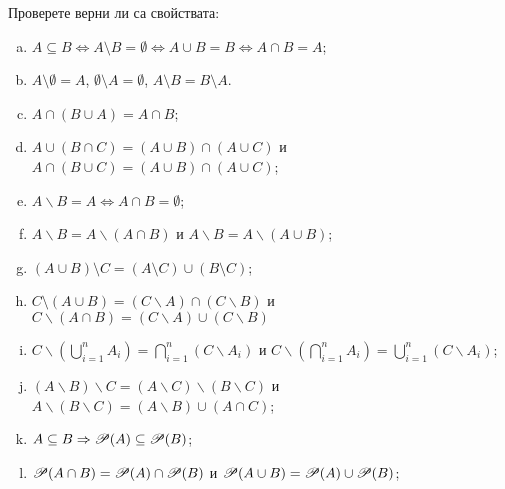 

\begin{problem}
  Проверете верни ли са свойствата:
  \begin{enumerate}[a)]
  \item
    $A\subseteq B \iff A\setminus B = \emptyset \iff A\cup B = B \iff A\cap B = A$;
  \item
    $A\setminus \emptyset = A$, $\emptyset\setminus A=\emptyset$, $A\setminus B = B\setminus A$.
  \item
    $A\cap (B\cup A) = A \cap B$;
  \item
    $A\cup(B\cap C) = (A\cup B)\cap(A\cup C)$ и $A \cap (B \cup C) = (A \cup B) \cap (A \cup C)$;
  \item
    $A\backslash B = A \iff A\cap B = \emptyset$;
  \item
    $A\backslash B = A\backslash (A\cap B)$ и $A\backslash B = A\backslash (A\cup B)$;
  \item
    $(A\cup B)\setminus C = (A\setminus C) \cup (B\setminus C)$;
  \item
    $C\setminus (A\cup B) = (C\backslash A)\cap(C\backslash B)$ и $C \backslash (A\cap B) = (C\backslash A)\cup(C\backslash B)$
  \item
    $C\backslash(\bigcup^{n}_{i=1} A_i) = \bigcap^{n}_{i=1} (C\backslash A_i)$ и $C \backslash(\bigcap^{n}_{i=1} A_i) = \bigcup^{n}_{i=1} (C\backslash A_i)$;
  \item
    $(A\backslash B)\backslash C = (A\backslash C)\backslash(B \backslash C)$ и $A\backslash (B\backslash C) = (A\backslash B) \cup (A\cap C)$;
  \item
    $A\subseteq B \Rightarrow \mathscr{P}(A) \subseteq \mathscr{P}(B)$;
  \item
    $\mathscr{P}(A\cap B) = \mathscr{P}(A) \cap \mathscr{P}(B)$ и $\mathscr{P}(A\cup B) = \mathscr{P}(A) \cup \mathscr{P}(B)$;
  \end{enumerate}
\end{problem}

